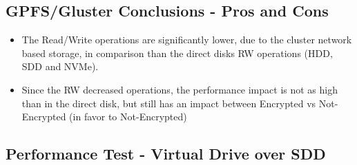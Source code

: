 \subsection{GPFS/Gluster Conclusions - Pros and Cons}
\begin{itemize}
  \item The Read/Write operations are significantly lower, due to the cluster network based storage, in comparison than the direct disks RW operations (HDD, SDD and NVMe).
  \item Since the RW decreased operations, the performance impact is not as high than in the direct disk, but still has an impact between Encrypted vs Not-Encrypted (in favor to Not-Encrypted)
\end{itemize}

\newpage
\subsection{Performance Test - Virtual Drive over SDD}
